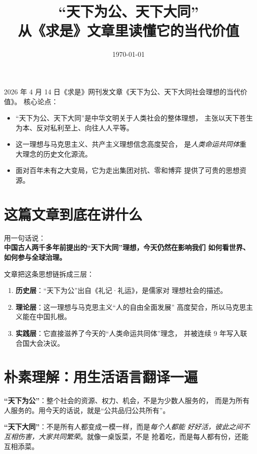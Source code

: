 \documentclass[11pt,a4paper]{ctexart}
\title{``天下为公、天下大同''\\ \large 从《求是》文章里读懂它的当代价值}
\author{}
\date{\today}
\begin{document}
\maketitle

\begin{articleblock}
2026 年 4 月 14 日《求是》网刊发文章《天下为公、天下大同社会理想的当代价值》。
核心论点：
\begin{itemize}
  \item ``天下为公、天下大同''是中华文明关于人类社会的整体理想，
        主张以天下苍生为本、反对私利至上、向往人人平等。
  \item 这一理想与马克思主义、共产主义理想信念高度契合，
        是\emph{人类命运共同体}重大理念的历史文化源流。
  \item 面对百年未有之大变局，它为走出集团对抗、零和博弈
        提供了可贵的思想资源。
\end{itemize}
\end{articleblock}

\tableofcontents
\newpage

\section{这篇文章到底在讲什么}

用一句话说：\\
\textbf{中国古人两千多年前提出的``天下大同''理想，今天仍然在影响我们
如何看世界、如何参与全球治理。}

文章把这条思想链拆成三层：

\begin{enumerate}[label=\textbf{层次\arabic*.}]
  \item \textbf{历史层}：``天下为公''出自《礼记·礼运》，是儒家对
        理想社会的描述。
  \item \textbf{理论层}：这一理想与马克思主义``人的自由全面发展''
        高度契合，所以马克思主义能在中国扎根。
  \item \textbf{实践层}：它直接滋养了今天的``人类命运共同体''理念，
        并被连续 9 年写入联合国大会决议。
\end{enumerate}

\section{朴素理解：用生活语言翻译一遍}

\begin{intuitionblock}
\textbf{``天下为公''}：整个社会的资源、权力、机会，不是为少数人服务的，
而是为所有人服务的。用今天的话说，就是``公共品归公共所有''。

\textbf{``天下大同''}：不是所有人都变成一模一样，而是\emph{每个人都能
好好活，彼此之间不互相伤害，大家共同繁荣}。就像一桌饭菜，不是
抢着吃，而是每人都有份，还能互相添菜。
\end{intuitionblock}
\end{document}
